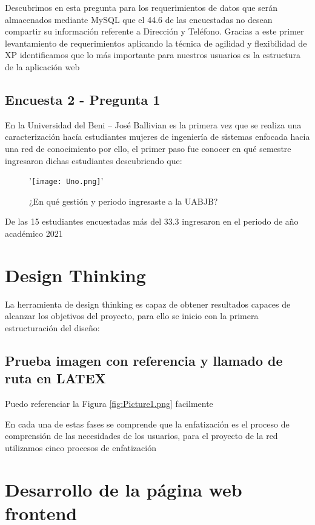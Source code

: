 \documentclass[hidelinks]{Documento}
\begin{document}
Descubrimos en esta pregunta para los requerimientos de datos que serán almacenados mediante MySQL que el 44.6 de las encuestadas no desean compartir su información referente a Dirección y Teléfono. Gracias a este primer levantamiento de requerimientos aplicando la técnica de agilidad y flexibilidad de XP identificamos que lo más importante para nuestros usuarios es la estructura de la aplicación web

\subsection{Encuesta 2 - Pregunta 1}

En la Universidad del Beni – José Ballivian es la primera vez que se realiza una caracterización hacía estudiantes mujeres de ingeniería de sistemas enfocada hacia una red de conocimiento por ello, el primer paso fue conocer en qué semestre ingresaron dichas estudiantes descubriendo que:

\begin{figure}[h]
\centering
'\texttt{[image: Uno.png]}'
\caption{¿En qué gestión y periodo ingresaste a la UABJB?}
\label{fig:Uno.png}
\end{figure}

De las 15 estudiantes encuestadas más del 33.3 ingresaron en el periodo de año académico 2021

\section{Design Thinking}

La herramienta de design thinking es capaz de obtener resultados capaces de alcanzar los objetivos del proyecto, para ello se inicio con la primera estructuración del diseño:


\subsection{Prueba imagen con referencia y llamado de ruta en LATEX}
Puedo referenciar la Figura \ref{fig:Picture1.png} facilmente

En cada una de estas fases se comprende que la enfatización es el proceso de comprensión de las necesidades de los usuarios, para el proyecto de la red utilizamos cinco procesos de enfatización

\section{Desarrollo de la página web frontend}
\end{document}
